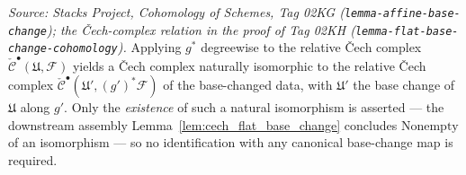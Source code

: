 \begin{definition}

  \label{def:cech_complex_base_change_iso}
  \textit{Source: Stacks Project, Cohomology of Schemes, Tag 02KG
  (\texttt{lemma-affine-base-change}); the {\v C}ech-complex relation in the proof of
  Tag 02KH (\texttt{lemma-flat-base-change-cohomology}).}
  Applying \(g^*\) degreewise to the relative {\v C}ech complex
  \(\check{\mathcal{C}}^\bullet(\mathfrak{U}, \mathcal{F})\) yields a {\v C}ech complex
  naturally isomorphic to the relative {\v C}ech complex
  \(\check{\mathcal{C}}^\bullet(\mathfrak{U}', (g')^*\mathcal{F})\) of the base-changed
  data, with \(\mathfrak{U}'\) the base change of \(\mathfrak{U}\) along \(g'\). Only the
  \emph{existence} of such a natural isomorphism is asserted --- the downstream
  assembly Lemma~\ref{lem:cech_flat_base_change} concludes \(\mathrm{Nonempty}\) of an
  isomorphism --- so no identification with any canonical base-change map is required.
\end{definition}


